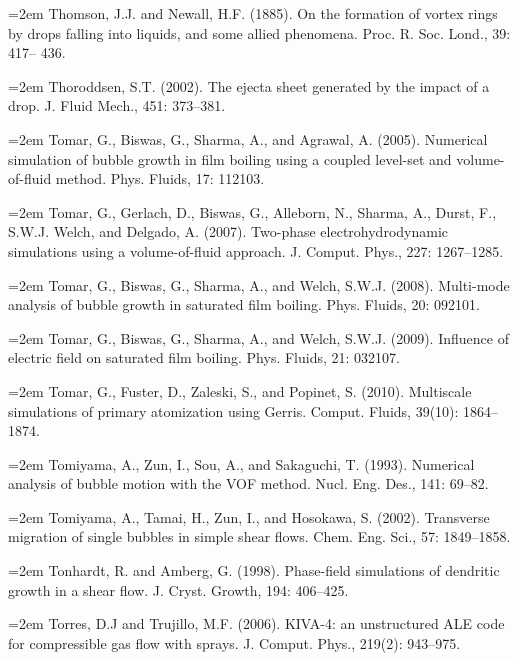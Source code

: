 \documentclass[11pt,a4paper,openany,fontset=none]{ctexbook}
\begin{document}
\par\hangindent=2em Thomson, J.J. and Newall, H.F. (1885). On the formation of vortex rings by drops falling into liquids, and some allied phenomena. Proc. R. Soc. Lond., 39: 417-- 436.

\par\hangindent=2em Thoroddsen, S.T. (2002). The ejecta sheet generated by the impact of a drop. J. Fluid Mech., 451: 373--381.

\par\hangindent=2em Tomar, G., Biswas, G., Sharma, A., and Agrawal, A. (2005). Numerical simulation of bubble growth in film boiling using a coupled level-set and volume-of-fluid method. Phys. Fluids, 17: 112103.

\par\hangindent=2em Tomar, G., Gerlach, D., Biswas, G., Alleborn, N., Sharma, A., Durst, F., S.W.J. Welch, and Delgado, A. (2007). Two-phase electrohydrodynamic simulations using a volume-of-fluid approach. J. Comput. Phys., 227: 1267--1285.

\par\hangindent=2em Tomar, G., Biswas, G., Sharma, A., and Welch, S.W.J. (2008). Multi-mode analysis of bubble growth in saturated film boiling. Phys. Fluids, 20: 092101.

\par\hangindent=2em Tomar, G., Biswas, G., Sharma, A., and Welch, S.W.J. (2009). Influence of electric field on saturated film boiling. Phys. Fluids, 21: 032107.

\par\hangindent=2em Tomar, G., Fuster, D., Zaleski, S., and Popinet, S. (2010). Multiscale simulations of primary atomization using Gerris. Comput. Fluids, 39(10): 1864--1874.

\par\hangindent=2em Tomiyama, A., Zun, I., Sou, A., and Sakaguchi, T. (1993). Numerical analysis of bubble motion with the VOF method. Nucl. Eng. Des., 141: 69--82.

\par\hangindent=2em Tomiyama, A., Tamai, H., Zun, I., and Hosokawa, S. (2002). Transverse migration of single bubbles in simple shear flows. Chem. Eng. Sci., 57: 1849--1858.

\par\hangindent=2em Tonhardt, R. and Amberg, G. (1998). Phase-field simulations of dendritic growth in a shear flow. J. Cryst. Growth, 194: 406--425.

\par\hangindent=2em Torres, D.J and Trujillo, M.F. (2006). KIVA-4: an unstructured ALE code for compressible gas flow with sprays. J. Comput. Phys., 219(2): 943--975.
\end{document}
